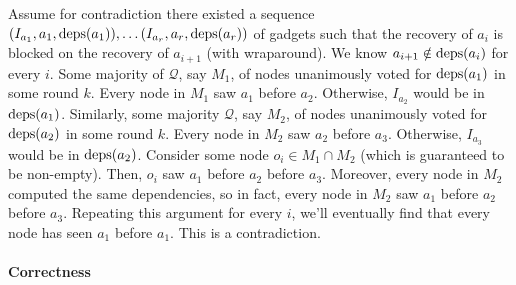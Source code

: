 Assume for contradiction there existed a sequence
$
  (I_{a_1}, a_1, \text{deps}(a_1)),
  \ldots
  (I_{a_r}, a_r, \text{deps}(a_r))
$
of gadgets such that the recovery of $a_i$ is blocked on the recovery of
$a_{i+1}$ (with wraparound). We know $a_{i+1} \notin \text{deps}(a_i)$ for every $i$.
%
Some majority of $\mathcal{Q}$, say $M_1$, of nodes unanimously voted for
$\text{deps}(a_1)$ in some round $k$. Every node in $M_1$ saw $a_1$ before $a_2$.
Otherwise, $I_{a_2}$ would be in $\text{deps}(a_1)$.
%
Similarly, some majority $\mathcal{Q}$, say $M_2$, of nodes unanimously voted
for $\text{deps}(a_2)$ in some round $k$. Every node in $M_2$ saw $a_2$ before $a_3$.
Otherwise, $I_{a_3}$ would be in $\text{deps}(a_2)$.
%
Consider some node $o_i \in M_1 \cap M_2$ (which is guaranteed to be
non-empty). Then, $o_i$ saw $a_1$ before $a_2$ before $a_3$. Moreover, every
node in $M_2$ computed the same dependencies, so in fact, every node in $M_2$
saw $a_1$ before $a_2$ before $a_3$. Repeating this argument for every $i$,
we'll eventually find that every node has seen $a_1$ before $a_1$. This is a
contradiction.

\paragraph{Correctness}

